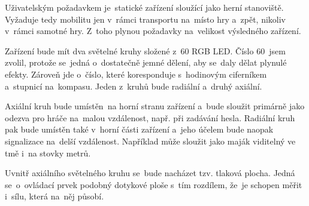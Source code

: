 
Uživatelským požadavkem je~statické zařízení sloužící jako herní stanoviště.
Vyžaduje tedy mobilitu jen v~rámci transportu na~místo hry a~zpět, nikoliv v~rámci samotné hry.
Z~toho plynou požadavky na~velikost výsledného zařízení.

Zařízení bude mít dva světelné kruhy složené z~60 RGB LED.
Číslo 60~jsem zvolil, protože se~jedná o~dostatečně jemné dělení, aby se~daly dělat plynulé efekty.
Zároveň jde o~číslo, které koresponduje s~hodinovým ciferníkem a~stupnicí na~kompasu.
Jeden z~kruhů bude radiální a~druhý axiální.

Axiální kruh bude umístěn~na horní stranu zařízení a~bude sloužit primárně jako odezva pro hráče na~malou vzdálenost, např. při zadávání hesla.
Radiální kruh pak bude umístěn také v~horní části zařízení a~jeho účelem bude naopak signalizace na~delší vzdálenost.
Například může sloužit jako maják viditelný ve tmě i~na stovky metrů.


Uvnitř axiálního světelného kruhu se~bude nacházet tzv. tlaková plocha. %
Jedná se~o~ovládací prvek podobný dotykové ploše s~tím rozdílem, že~je schopen měřit i~sílu, která na~něj působí.

